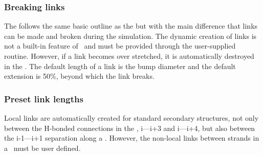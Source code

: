 \subsubsection{Breaking links}

The  follows the same basic outline as the  but with the main
difference that links can be made and broken during the simulation.   The dynamic creation
of links is not a built-in feature of \NAME\ and must be provided through the user-supplied
 routine.   However, if a link becomes over stretched, it is automatically destroyed in
the .    The default length of a link is the bump diameter and the default extension
is 50\%, beyond which the link breaks.

\subsubsection{Preset link lengths}

Local links are automatically created for standard secondary structures,  not only between the H-bonded
connections in the \AH, i---i+3 and i---i+4, but also between the i-1---i+1 separation along a \Bs.
However, the non-local links between strands in a \BS\ must be user defined.
